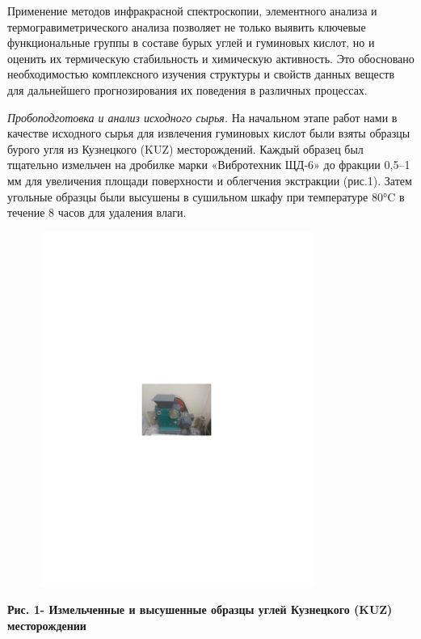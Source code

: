 Применение методов инфракрасной спектроскопии, элементного анализа и
термогравиметрического анализа позволяет не только выявить ключевые
функциональные группы в составе бурых углей и гуминовых кислот, но и
оценить их термическую стабильность и химическую активность. Это
обосновано необходимостью комплексного изучения структуры и свойств
данных веществ для дальнейшего прогнозирования их поведения в различных
процессах.

\emph{Пробоподготовка и анализ исходного сырья.} На начальном этапе
работ нами в качестве исходного сырья для извлечения гуминовых кислот
были взяты образцы бурого угля из Кузнецкого (KUZ) месторождений. Каждый
образец был тщательно измельчен на дробилке марки «Вибротехник ЩД-6» до
фракции 0,5--1 мм для увеличения площади поверхности и облегчения
экстракции (рис.1). Затем угольные образцы были высушены в сушильном
шкафу при температуре 80°C в течение 8 часов для удаления влаги.

\begin{figure}[H]
	\centering
	\includegraphics[width=0.8\textwidth]{media/gorn3/image2}
	\caption*{}
\end{figure}


{\bfseries Рис. 1- Измельченные и высушенные образцы углей Кузнецкого (KUZ)
месторождении}

